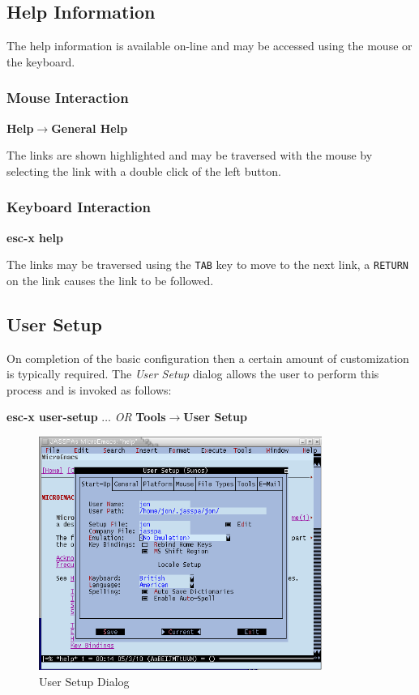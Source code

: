 \documentclass[11pt,a4paper,pdftex]{article}
\begin{document}
\subsection{Help Information}

  The help information is available on-line and may be accessed using the
  mouse or the keyboard.

\subsubsection{Mouse Interaction}

  \textbf{Help$\rightarrow$General Help}

  The links are shown highlighted and may be traversed with the mouse by
  selecting the link with a double click of the left button.

\subsubsection{Keyboard Interaction}

  \textbf{esc-x help}

  The links may be traversed using the \texttt{TAB} key to move to the next
  link, a \texttt{RETURN} on the link causes the link to be followed.

\subsection{User Setup}

  On completion of the basic configuration then a certain amount of
  customization is typically required. The \textit{User Setup} dialog allows
  the user to perform this process and is invoked as follows:

  \textbf{esc-x user-setup} $\dots$ \textit{OR}\newline
  \textbf{Tools$\rightarrow$User Setup}

\begin{figure}[!hbt]
  \begin{center}
    \includegraphics[keepaspectratio,height=3in]{usersetup}
    \caption{User Setup Dialog}
    \label{fig:usersetup}
  \end{center}
\end{figure}
\end{document}
